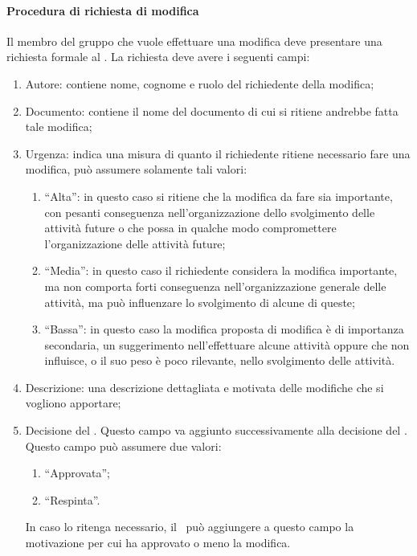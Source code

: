 \documentclass[../NormeProgetto.tex]{subfiles}
\begin{document}
	\paragraph{Procedura di richiesta di modifica}
		Il membro del gruppo che vuole effettuare una modifica deve presentare una richiesta formale al \responsabilediprogetto. La richiesta deve avere i seguenti campi:
		\begin{enumerate}
			\item Autore: contiene nome, cognome e ruolo del richiedente della modifica;
			\item Documento: contiene il nome del documento di cui si ritiene andrebbe fatta tale modifica;
			\item Urgenza: indica una misura di quanto il richiedente ritiene necessario fare una modifica, può assumere solamente tali valori:
				\begin{enumerate}
					\item ``Alta'': in questo caso si ritiene che la modifica da fare sia importante, con pesanti conseguenza nell'organizzazione dello svolgimento delle attività future o che possa in qualche modo compromettere l'organizzazione delle attività future;
					\item ``Media'': in questo caso il richiedente considera la modifica importante, ma non comporta forti conseguenza nell'organizzazione generale delle attività, ma può influenzare lo svolgimento di alcune di queste;
					\item ``Bassa'': in questo caso la modifica proposta di modifica è di importanza secondaria, un suggerimento nell'effettuare alcune attività oppure che non influisce, o il suo peso è poco rilevante, nello svolgimento delle attività.
				\end{enumerate}
			\item Descrizione: una descrizione dettagliata e motivata delle modifiche che si vogliono apportare;
			\item Decisione del \responsabilediprogetto. Questo campo va aggiunto successivamente alla decisione del \responsabilediprogetto. Questo campo può assumere due valori:
				\begin{enumerate}
					\item ``Approvata'';
					\item ``Respinta''.
				\end{enumerate}
			In caso lo ritenga necessario, il \responsabilediprogetto\ può aggiungere a questo campo la motivazione per cui ha approvato o meno la modifica.
		\end{enumerate}
\end{document}
